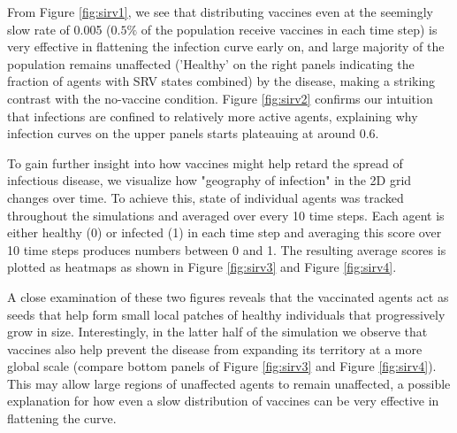 \documentclass[12pt, reqno]{amsart}
\begin{document}
    \vspace{5mm}
    From Figure \ref{fig:sirv1}, we see that distributing vaccines even at the seemingly slow rate of 0.005 (\(0.5\%\) of the population receive vaccines in each time step) is very effective in flattening the infection curve early on, and large majority of the population remains unaffected ('Healthy' on the right panels indicating the fraction of agents with SRV states combined) by the disease, making a striking contrast with the no-vaccine condition. Figure \ref{fig:sirv2} confirms our intuition that infections are confined to relatively more active agents, explaining why infection curves on the upper panels starts plateauing at around 0.6.  
    
    To gain further insight into how vaccines might help retard the spread of infectious disease, we visualize how "geography of infection" in the 2D grid changes over time. To achieve this, state of individual agents was tracked throughout the simulations and averaged over every 10 time steps. Each agent is either healthy (0) or infected (1) in each time step and averaging this score over 10 time steps produces numbers between 0 and 1. The resulting average scores is plotted as heatmaps as shown in Figure \ref{fig:sirv3} and Figure \ref{fig:sirv4}.
    
    A close examination of these two figures reveals that the vaccinated agents act as seeds that help form small local patches of healthy individuals that progressively grow in size. Interestingly, in the latter half of the simulation we observe that vaccines also help prevent the disease from expanding its territory at a more global scale (compare bottom panels of Figure \ref{fig:sirv3} and Figure \ref{fig:sirv4}). This may allow large regions of unaffected agents to remain unaffected, a possible explanation for how even a slow distribution of vaccines can be very effective in flattening the curve.      
    
\end{document}
